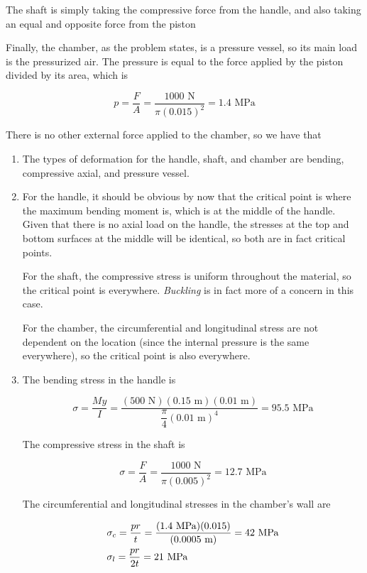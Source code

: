 \documentclass[a4paper,openany,12pt]{book}
\begin{document}
{{\begin{enumerate}
The shaft is simply taking the compressive force from the handle, and
also taking an equal and opposite force from the piston


Finally, the chamber, as the problem states, is a pressure vessel, so
its main load is the pressurized air. The pressure is equal to the
force applied by the piston divided by its area, which is

$$p = \frac{F}{A} = \frac{1000 \text{ N}}{\pi (0.015)^2} = 1.4 \text{ MPa}$$

There is no other external force applied to the chamber, so we have
that


\begin{enumerate}
\item The types of deformation for the handle, shaft, and chamber are
bending, compressive axial, and pressure vessel.

\item For the handle, it should be obvious by now that the critical point
is where the maximum bending moment is, which is at the middle of the
handle. Given that there is no axial load on the handle, the stresses
at the top and bottom surfaces at the middle will be identical, so
both are in fact critical points.

For the shaft, the compressive stress is uniform throughout the
material, so the critical point is everywhere. \emph{Buckling} is in fact
more of a concern in this case.

For the chamber, the circumferential and longitudinal stress are not
dependent on the location (since the internal pressure is the same
everywhere), so the critical point is also everywhere.

\item The bending stress in the handle is

$$\sigma = \frac{My}{I} = \frac{(500 \text{ N})(0.15 \text{ m})(0.01 \text{ m})}{\dfrac{\pi }{4}{(0.01 \text{ m})^4}} = 95.5 \text{ MPa}$$

The compressive stress in the shaft is

$$\sigma = \frac{F}{A} = \frac{1000 \text{ N}}{\pi (0.005)^2} = 12.7 \text{ MPa}$$

The circumferential and longitudinal stresses in the chamber's wall
are

$$\begin{gathered}
     \sigma_c = \frac{pr}{t} = \frac{(1.4 \text{ MPa})(0.015)}{(0.0005 \text{ m})} = 42 \text{ MPa} \hfill \\
     \sigma_l = \frac{pr}{2t} = 21 \text{ MPa} \hfill \\ 
   \end{gathered}$$


\end{enumerate}
\end{enumerate}}}
\end{document}
